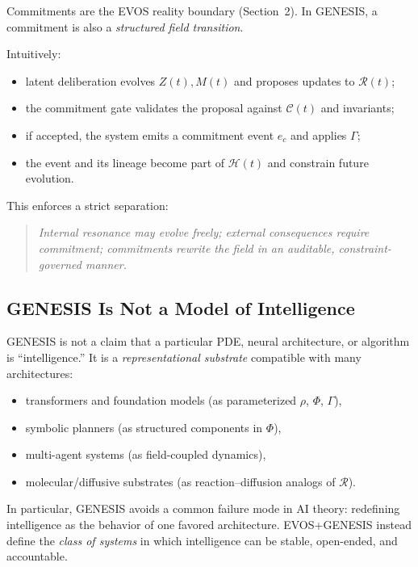 \documentclass[11pt]{article}
\begin{document}
Commitments are the EVOS reality boundary (Section~2). In GENESIS, a commitment is also a
\emph{structured field transition}.

Intuitively:
\begin{itemize}
  \item latent deliberation evolves $Z(t), M(t)$ and proposes updates to $\mathcal{R}(t)$;
  \item the commitment gate validates the proposal against $\mathcal{C}(t)$ and invariants;
  \item if accepted, the system emits a commitment event $e_c$ and applies $\Gamma$;
  \item the event and its lineage become part of $\mathcal{H}(t)$ and constrain future evolution.
\end{itemize}

This enforces a strict separation:
\begin{quote}
\emph{Internal resonance may evolve freely; external consequences require commitment; commitments
rewrite the field in an auditable, constraint-governed manner.}
\end{quote}

\vspace{0.5em}
\subsection{GENESIS Is Not a Model of Intelligence}

GENESIS is not a claim that a particular PDE, neural architecture, or algorithm is
``intelligence.'' It is a \emph{representational substrate} compatible with many
architectures:
\begin{itemize}
  \item transformers and foundation models (as parameterized $\rho$, $\Phi$, $\Gamma$),
  \item symbolic planners (as structured components in $\Phi$),
  \item multi-agent systems (as field-coupled dynamics),
  \item molecular/diffusive substrates (as reaction--diffusion analogs of $\mathcal{R}$).
\end{itemize}

In particular, GENESIS avoids a common failure mode in AI theory: redefining intelligence
as the behavior of one favored architecture. EVOS+GENESIS instead define the \emph{class of
systems} in which intelligence can be stable, open-ended, and accountable.

\vspace{0.5em}
\end{document}
